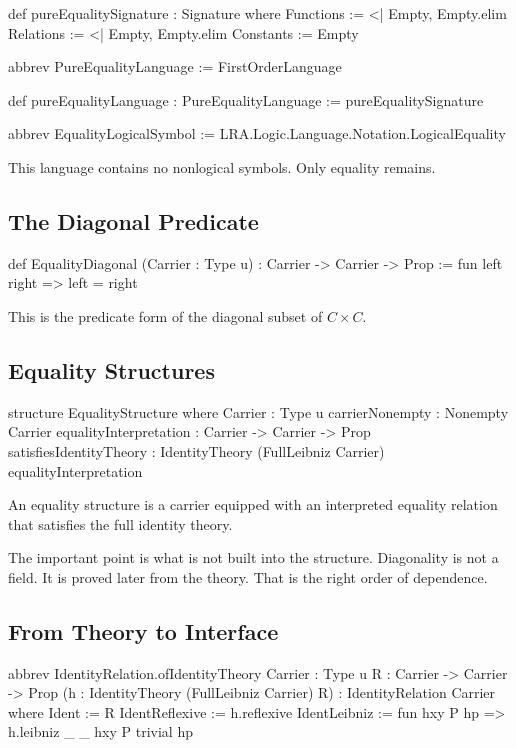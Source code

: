 \documentclass[11pt]{article}
\begin{document}
\begin{leanblock}
def pureEqualitySignature : Signature where
  Functions := <| Empty, Empty.elim
  Relations := <| Empty, Empty.elim
  Constants := Empty

abbrev PureEqualityLanguage := FirstOrderLanguage

def pureEqualityLanguage : PureEqualityLanguage :=
  pureEqualitySignature

abbrev EqualityLogicalSymbol := LRA.Logic.Language.Notation.LogicalEquality
\end{leanblock}

This language contains no nonlogical symbols. Only equality remains.

\subsection{The Diagonal Predicate}

\begin{leanblock}
def EqualityDiagonal (Carrier : Type u) : Carrier -> Carrier -> Prop :=
  fun left right => left = right
\end{leanblock}

This is the predicate form of the diagonal subset of \(C \times C\).

\subsection{Equality Structures}

\begin{leanblock}
structure EqualityStructure where
  Carrier : Type u
  carrierNonempty : Nonempty Carrier
  equalityInterpretation : Carrier -> Carrier -> Prop
  satisfiesIdentityTheory :
    IdentityTheory (FullLeibniz Carrier) equalityInterpretation
\end{leanblock}

An equality structure is a carrier equipped with an interpreted equality relation that satisfies the full identity theory.

The important point is what is not built into the structure. Diagonality is not a field. It is proved later from the theory. That is the right order of dependence.

\subsection{From Theory to Interface}

\begin{leanblock}
abbrev IdentityRelation.ofIdentityTheory {Carrier : Type u}
    {R : Carrier -> Carrier -> Prop}
    (h : IdentityTheory (FullLeibniz Carrier) R) : IdentityRelation Carrier where
  Ident := R
  IdentReflexive := h.reflexive
  IdentLeibniz := fun hxy P hp => h.leibniz _ _ hxy P trivial hp
\end{leanblock}
\end{document}

